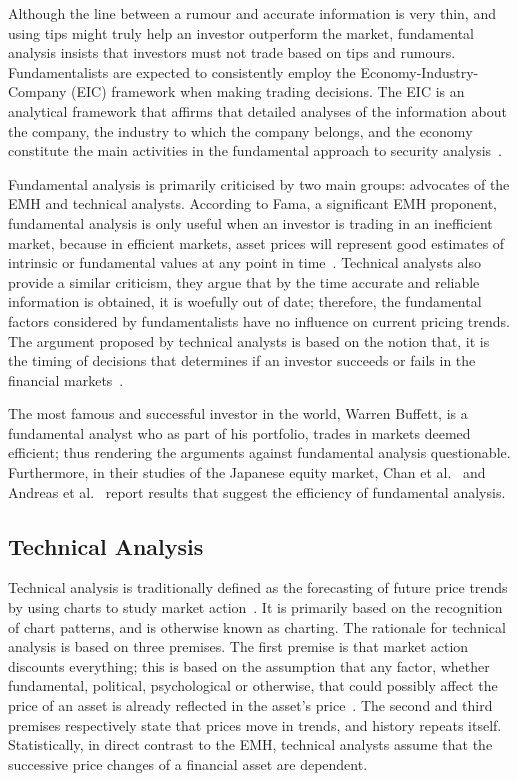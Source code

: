 \documentclass[13pt]{report}
\begin{document}
Although the line between a rumour and accurate information is very thin, and using tips might truly help an investor outperform the market, fundamental analysis insists that investors must not trade based on tips and rumours. Fundamentalists are expected to consistently employ the Economy-Industry-Company (EIC) framework when making trading decisions. The EIC is an analytical framework that affirms that detailed analyses of the information about the company, the industry to which the company belongs, and the economy constitute the main activities in the fundamental approach to security analysis~\cite{kevin2015security}.\par

Fundamental analysis is primarily criticised by two main groups: advocates of the EMH and technical analysts. According to Fama, a significant EMH proponent, fundamental analysis is only useful when an investor is trading in an inefficient market, because in efficient markets, asset prices will represent good estimates of intrinsic or fundamental values at any point in time~\cite{fama1995random}. Technical analysts also provide a similar criticism, they argue that by the time accurate and reliable information is obtained, it is woefully out of date; therefore, the fundamental factors considered by fundamentalists have no influence on current pricing trends. The argument proposed by technical analysts is based on the notion that, it is the timing of decisions that determines if an investor succeeds or fails in the financial markets~\cite{marketthomsett2006getting}.

The most famous and successful investor in the world, Warren Buffett, is a fundamental analyst who as part of his portfolio, trades in markets deemed efficient; thus rendering the arguments against fundamental analysis questionable. Furthermore, in their studies of the Japanese equity market, Chan et al.~\cite{chan1993can} and Andreas et al.~\cite{charitou2000value} report results that suggest the efficiency of fundamental analysis.

 

\subsection{Technical Analysis}
Technical analysis is traditionally defined as the forecasting of future price trends by using charts to study market action~\cite{murphy1999technical}. It is primarily based on the recognition of chart patterns, and is otherwise known as charting. The rationale for technical analysis is based on three premises. The first premise is that market action discounts everything; this is based on the assumption that any factor, whether fundamental, political, psychological or otherwise, that could possibly affect the price of an asset is already reflected in the asset's price~\cite{murphy1999technical}. The second and third premises respectively state that prices move in trends, and history repeats itself. Statistically, in direct contrast to the EMH, technical analysts assume that the successive price changes of a financial asset are dependent.\par
\end{document}

